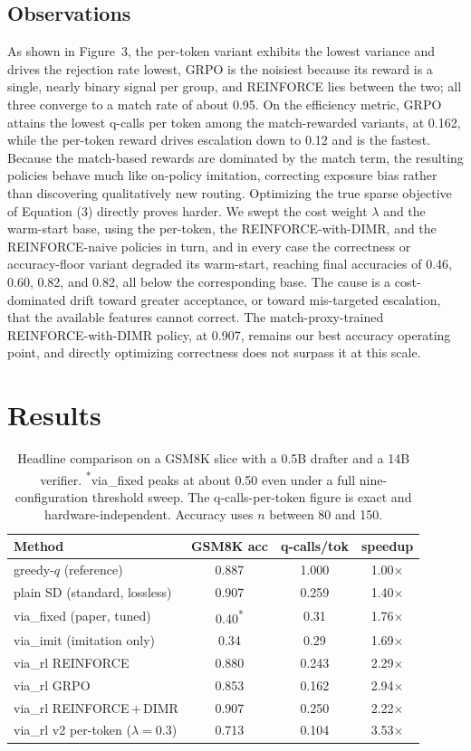 \documentclass[11pt]{article}
\begin{document}
\subsection{Observations}
As shown in Figure~3, the per-token variant exhibits the lowest variance and drives the rejection rate
lowest, GRPO is the noisiest because its reward is a single, nearly binary signal per group, and
REINFORCE lies between the two; all three converge to a match rate of about 0.95. On the efficiency
metric, GRPO attains the lowest q-calls per token among the match-rewarded variants, at 0.162, while
the per-token reward drives escalation down to 0.12 and is the fastest. Because the match-based rewards
are dominated by the match term, the resulting policies behave much like on-policy imitation,
correcting exposure bias rather than discovering qualitatively new routing. Optimizing the true sparse
objective of Equation (3) directly proves harder. We swept the cost weight $\lambda$ and the warm-start
base, using the per-token, the REINFORCE-with-DIMR, and the REINFORCE-naive policies in turn, and in
every case the correctness or accuracy-floor variant degraded its warm-start, reaching final accuracies
of 0.46, 0.60, 0.82, and 0.82, all below the corresponding base. The cause is a cost-dominated drift
toward greater acceptance, or toward mis-targeted escalation, that the available features cannot
correct. The match-proxy-trained REINFORCE-with-DIMR policy, at 0.907, remains our best accuracy
operating point, and directly optimizing correctness does not surpass it at this scale.

\section{Results}
\begin{table}[H]\centering\small
\begin{tabular}{lccc}
\toprule
Method & GSM8K acc & q-calls/tok & speedup \\
\midrule
greedy-$q$ (reference)        & 0.887 & 1.000 & 1.00$\times$ \\
plain SD (standard, lossless) & 0.907 & 0.259 & 1.40$\times$ \\
\midrule
via\_fixed (paper, tuned)     & 0.40\textsuperscript{*} & 0.31 & 1.76$\times$ \\
via\_imit (imitation only)    & 0.34  & 0.29 & 1.69$\times$ \\
\midrule
via\_rl REINFORCE             & 0.880 & 0.243 & 2.29$\times$ \\
via\_rl GRPO                  & 0.853 & 0.162 & 2.94$\times$ \\
via\_rl REINFORCE\,+\,DIMR    & 0.907 & 0.250 & 2.22$\times$ \\
via\_rl v2 per-token ($\lambda{=}0.3$) & 0.713 & 0.104 & 3.53$\times$ \\
\bottomrule
\end{tabular}
\caption{Headline comparison on a GSM8K slice with a 0.5B drafter and a 14B verifier.
\textsuperscript{*}via\_fixed peaks at about 0.50 even under a full nine-configuration threshold sweep.
The q-calls-per-token figure is exact and hardware-independent. Accuracy uses $n$ between 80 and 150.}
\end{table}
\end{document}
